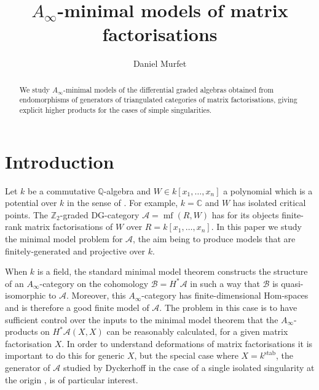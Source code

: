 \documentclass[english,letter paper,12pt,leqno]{article}
\theoremstyle{example}
\numberwithin{equation}{section}
\def\res{\operatorname{Res}}
\def\stab{\operatorname{stab}}
\def\nZ{\mathds{Z}}
\begin{document}
\def\Res{\res\!}
\newcommand{\ud}{\mathrm{d}}
\newcommand{\Ress}[1]{\res_{#1}\!}
\newcommand{\cat}[1]{\mathcal{#1}}
\newcommand{\lto}{\longrightarrow}
\newcommand{\xlto}[1]{\stackrel{#1}\lto}
\newcommand{\mf}[1]{\mathfrak{#1}}
\newcommand{\md}[1]{\mathscr{#1}}
\def\sus{\l}
\def\l{\,|\,}
\def\sgn{\textup{sgn}}
\def\samp{\zeta}
\def\Samp{Z}
\def\traff{N}

\title{$A_\infty$-minimal models of matrix factorisations}
\author{Daniel Murfet}

\maketitle

\begin{abstract}
We study $A_\infty$-minimal models of the differential graded algebras obtained from endomorphisms of generators of triangulated categories of matrix factorisations, giving explicit higher products for the cases of simple singularities. 
\end{abstract}

\section{Introduction}

Let $k$ be a commutative $\mathbb{Q}$-algebra and $W \in k[x_1,\ldots,x_n]$ a polynomial which is a potential over $k$ in the sense of \cite[\S 2.2]{lgdual}. For example, $k = \mathbb{C}$ and $W$ has isolated critical points. The $\nZ_2$-graded DG-category $\cat{A} = \operatorname{mf}(R, W)$ has for its objects finite-rank matrix factorisations of $W$ over $R = k[x_1,\ldots,x_n]$. In this paper we study the minimal model problem for $\cat{A}$, the aim being to produce models that are finitely-generated and projective over $k$.

When $k$ is a field, the standard minimal model theorem \cite{??} constructs the structure of an $A_\infty$-category on the cohomology $\cat{B} = H^* \cat{A}$ in such a way that $\cat{B}$ is quasi-isomorphic to $\cat{A}$. Moreover, this $A_\infty$-category has finite-dimensional Hom-spaces and is therefore a good finite model of $\cat{A}$. The problem in this case is to have sufficient control over the inputs to the minimal model theorem that the $A_\infty$-products on $H^* \cat{A}(X,X)$ can be reasonably calculated, for a given matrix factorisation $X$. In order to understand deformations of matrix factorisations \cite{??,??,??} it is important to do this for generic $X$, but the special case where $X = k^{\stab}$, the generator of $\cat{A}$ studied by Dyckerhoff in the case of a single isolated singularity at the origin \cite{d0904.4713}, is of particular interest.
\end{document}
